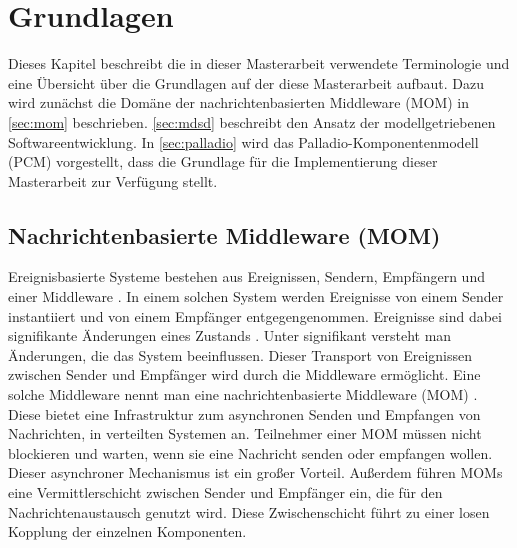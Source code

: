 
\chapter{Grundlagen}
\label{ch:Grundlagen}
Dieses Kapitel beschreibt die in dieser Masterarbeit verwendete Terminologie und eine Übersicht über die Grundlagen auf der diese Masterarbeit aufbaut. Dazu wird zunächst die Domäne der nachrichtenbasierten Middleware (MOM) in \autoref{sec:mom} beschrieben. \autoref{sec:mdsd} beschreibt den Ansatz der modellgetriebenen Softwareentwicklung. In \autoref{sec:palladio} wird das Palladio-Komponentenmodell (PCM) vorgestellt, dass die Grundlage für die Implementierung dieser Masterarbeit zur Verfügung stellt.

\section{Nachrichtenbasierte Middleware (MOM)}
\label{sec:mom}
Ereignisbasierte Systeme bestehen aus Ereignissen, Sendern, Empfängern und einer Middleware \cite{Carzaniga1998}. In einem solchen System werden Ereignisse von einem Sender instantiiert und von einem Empfänger entgegengenommen. Ereignisse sind dabei signifikante Änderungen eines Zustands \cite{Chandy2006}. Unter signifikant versteht man Änderungen, die das System beeinflussen. Dieser Transport von Ereignissen zwischen Sender und Empfänger wird durch die Middleware ermöglicht. Eine solche Middleware nennt man eine nachrichtenbasierte Middleware (MOM) \cite{Curry05}. Diese bietet eine Infrastruktur zum asynchronen Senden und Empfangen von Nachrichten, in verteilten Systemen an. Teilnehmer einer MOM müssen nicht blockieren und warten, wenn sie eine Nachricht senden oder empfangen wollen. Dieser asynchroner Mechanismus ist ein großer Vorteil. Außerdem führen MOMs eine Vermittlerschicht zwischen Sender und Empfänger ein, die für den Nachrichtenaustausch genutzt wird. Diese Zwischenschicht führt zu einer losen Kopplung der einzelnen Komponenten.  \\

